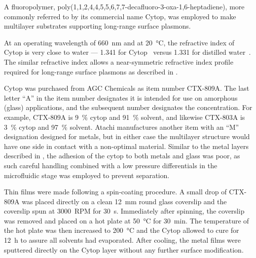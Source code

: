 A fluoropolymer, poly(1,1,2,4,4,5,5,6,7,7-decafluoro-3-oxa-1,6-heptadiene),
more commonly referred to by its commercial name Cytop, was employed to
make multilayer substrates supporting long-range surface plasmons.

At an operating wavelength of \SI{660}{\nano\meter} and at
\SI{20}{\celsius}, the refractive index of Cytop is very close to water ---
1.341 for Cytop~\cite{mikevs2005synthesis} versus 1.331 for distilled
water~\cite{andreasson1971measurement}.  The similar refractive index
allows a near-symmetric refractive index profile required for long-range
surface plasmons as described in .

Cytop was purchased from AGC Chemicals as item number CTX-809A\@.  The last
letter ``A'' in the item number designates it is intended for use on amorphous
(glass) applications, and the subsequent number designates the concentration.
For example, CTX-809A is \SI{9}{\percent} cytop and \SI{91}{\percent} solvent,
and likewise CTX-803A is \SI{3}{\percent} cytop and \SI{97}{\percent} solvent.
Atachi manufactures another item with an ``M'' designation designed for
metals, but in either case the multilayer structure would have one side in
contact with a non-optimal material.  Similar to the metal layers described in
, the adhesion of the cytop to both metals and
glass was poor, as such careful handling combined with a low pressure
differentials in the microfluidic stage was employed to prevent separation.

Thin films were made following a spin-coating procedure.  A small drop of
CTX-809A was placed directly on a clean \SI{12}{\milli\meter} round glass
coverslip and the coverslip spun at \SI{3000}{RPM} for \SI{30}{\second}.
Immediately after spinning, the coverslip was removed and placed on a hot
plate at \SI{50}{\celsius} for \SI{30}{\minute}.  The temperature of the hot
plate was then increased to \SI{200}{\celsius} and the Cytop allowed to cure
for \SI{12}{\hour} to assure all solvents had evaporated.  After cooling, the
metal films were sputtered directly on the Cytop layer without any further
surface modification.

